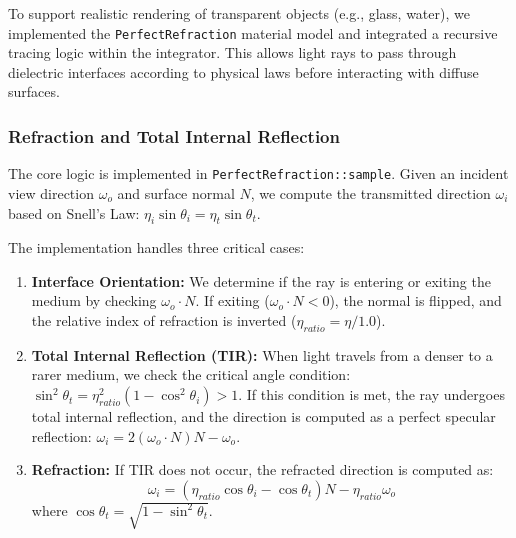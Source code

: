 \documentclass[acmtog]{acmart}
\begin{document}
To support realistic rendering of transparent objects (e.g., glass, water), we implemented the \texttt{PerfectRefraction} material model and integrated a recursive tracing logic within the integrator. This allows light rays to pass through dielectric interfaces according to physical laws before interacting with diffuse surfaces.

\subsubsection{Refraction and Total Internal Reflection}
The core logic is implemented in \texttt{PerfectRefraction::sample}. Given an incident view direction $\omega_o$ and surface normal $N$, we compute the transmitted direction $\omega_i$ based on Snell's Law: $\eta_i \sin \theta_i = \eta_t \sin \theta_t$.

The implementation handles three critical cases:
\begin{enumerate}
    \item \textbf{Interface Orientation:} We determine if the ray is entering or exiting the medium by checking $\omega_o \cdot N$. If exiting ($\omega_o \cdot N < 0$), the normal is flipped, and the relative index of refraction is inverted ($\eta_{ratio} = \eta / 1.0$).
    \item \textbf{Total Internal Reflection (TIR):} When light travels from a denser to a rarer medium, we check the critical angle condition: $\sin^2 \theta_t = \eta_{ratio}^2 (1 - \cos^2 \theta_i) > 1$. If this condition is met, the ray undergoes total internal reflection, and the direction is computed as a perfect specular reflection: $\omega_i = 2(\omega_o \cdot N)N - \omega_o$.
    \item \textbf{Refraction:} If TIR does not occur, the refracted direction is computed as:
    \begin{equation}
        \omega_i = (\eta_{ratio} \cos \theta_i - \cos \theta_t) N - \eta_{ratio} \omega_o
    \end{equation}
    where $\cos \theta_t = \sqrt{1 - \sin^2 \theta_t}$.
\end{enumerate}
\end{document}
